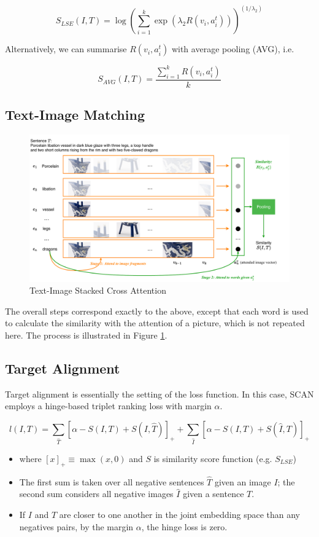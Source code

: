 $$
S_{L S E}(I, T)=\log \left(\sum_{i=1}^{k} \exp \left(\lambda_{2} R\left(v_{i}, a_{i}^{t}\right)\right)\right)^{\left(1 / \lambda_{2}\right)}
$$

Alternatively, we can
summarise $R\left(v_{i}, a_{i}^{t}\right)$ with average pooling (AVG), i.e.

$$
S_{A V G}(I, T)=\frac{\sum_{i=1}^{k} R\left(v_{i}, a_{i}^{t}\right)}{k}
$$

\subsection{Text-Image Matching}

\begin{figure}[h!]
\centering
\includegraphics[width=1\textwidth]{scan2.pdf}
\caption{Text-Image Stacked Cross Attention}
\label{fig:scan2}
\end{figure}

The overall steps correspond exactly to the above, except that each word is used to calculate the similarity with the attention of a picture, which is not repeated here. The process is illustrated in Figure \ref{fig:scan2}.

\subsection{Target Alignment}
Target alignment is essentially the setting of the loss function. In this case, SCAN employs a hinge-based triplet ranking loss with margin $\alpha$.

$$
l(I, T)=\sum_{\hat{T}}[\alpha-S(I, T)+S(I, \hat{T})]_{+}+\sum_{\hat{I}}[\alpha-S(I, T)+S(\hat{I}, T)]_{+}
$$

\begin{itemize}
    \item where $[x]_{+} \equiv \max (x, 0)$ and $S$ is similarity score function (e.g. $S_{L S E}$)
    \item The first sum is taken over all negative sentences $\hat{T}$ given an image $I$; the second sum considers all negative images $\hat{I}$ given a sentence $T$.
    \item If $I$ and $T$ are closer to one another in the joint embedding space than any negatives pairs, by the margin $\alpha$, the hinge loss is zero.
\end{itemize}

